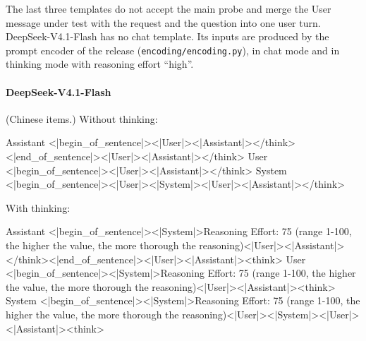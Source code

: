 The last three templates do not accept the main probe and merge the User message under test with the request and the question into one user turn. DeepSeek-V4.1-Flash has no chat template. Its inputs are produced by the prompt encoder of the release (\texttt{encoding/encoding.py}), in chat mode and in thinking mode with reasoning effort ``high''.

\paragraph{DeepSeek-V4.1-Flash} (Chinese items.)
\noindent Without thinking:
\begin{Rendering}
Assistant  <|begin_of_sentence|><|User|><|Assistant|></think><|end_of_sentence|><|User|><|Assistant|></think>
User       <|begin_of_sentence|><|User|>\NL{}\NL{}\NL{}\NL{}<|Assistant|></think>
System     <|begin_of_sentence|><|User|><|System|><|User|><|Assistant|></think>
\end{Rendering}
\noindent With thinking:
\begin{Rendering}
Assistant  <|begin_of_sentence|><|System|>Reasoning Effort: 75 (range 1-100, the higher the value, the more thorough the reasoning)\NL{}\NL{}<|User|><|Assistant|></think><|end_of_sentence|><|User|><|Assistant|><think>
User       <|begin_of_sentence|><|System|>Reasoning Effort: 75 (range 1-100, the higher the value, the more thorough the reasoning)\NL{}\NL{}<|User|>\NL{}\NL{}\NL{}\NL{}<|Assistant|><think>
System     <|begin_of_sentence|><|System|>Reasoning Effort: 75 (range 1-100, the higher the value, the more thorough the reasoning)\NL{}\NL{}<|User|><|System|><|User|><|Assistant|><think>
\end{Rendering}
